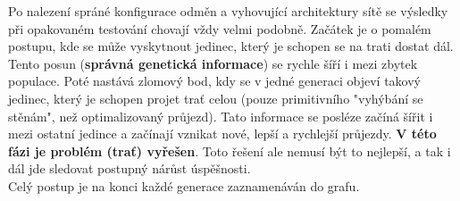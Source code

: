 \documentclass[a4paper,12pt]{article}
\begin{document}
            Po nalezení spráné konfigurace odměn a vyhovující architektury sítě
            se výsledky při opakovaném testování chovají vždy velmi podobně.
            Začátek je o pomalém postupu, kde se může vyskytnout jedinec, který
            je schopen se na trati dostat dál. Tento posun (\textbf{správná genetická informace})
            se rychle šíří i mezi zbytek populace. Poté nastává zlomový bod, kdy se
            v jedné generaci objeví takový jedinec, který je schopen projet trať celou
            (pouze primitivního "vyhýbání se stěnám", než optimalizovaný průjezd). 
            Tato informace se posléze začíná šířit i mezi ostatní jedince a začínají vznikat nové,
            lepší a rychlejší průjezdy. \textbf{V této fázi je problém (trať) vyřešen}.
            Toto řešení ale nemusí být to nejlepší, a tak i dál jde sledovat postupný nárůst
            úspěšnosti.\\
            Celý postup je na konci každé generace zaznamenáván do grafu.
\end{document}
